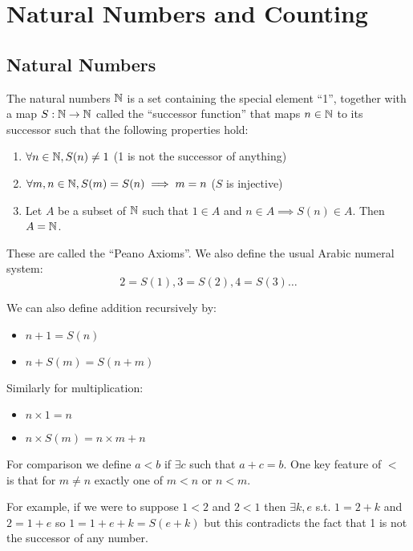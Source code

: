 \documentclass[../main.tex]{subfiles}
\begin{document}
\chapter{Natural Numbers and Counting}
\section{Natural Numbers}
\begin{definition}
  \label{naturalDef}
  The natural numbers $\mathbb{N}$ is a set containing the special element ``1'', together with a map $S: \mathbb{N} \to \mathbb{N}$ called the ``successor function'' that maps $n \in \mathbb{N}$ to its successor such that the following properties hold:
  \begin{enumerate}
    \item $\forall n \in \mathbb{N}, S(n) \neq 1$ (1 is not the successor of anything)
    \item $\forall m, n \in \mathbb{N}, S(m) = S(n) \implies m = n$ ($S$ is injective)
    \item Let $A$ be a subset of $\mathbb{N}$ such that $1 \in A$ and $n \in A \implies S(n) \in A$. Then $A = \mathbb{N}$.
  \end{enumerate}
\end{definition}
These are called the ``Peano Axioms''.
We also define the usual Arabic numeral system:
\[
  2 = S(1), 3 = S(2), 4 = S(3) \ldots
\]

We can also define addition recursively by:
\begin{itemize}
  \item $n + 1 = S(n)$
  \item $n + S(m) = S(n + m)$
\end{itemize}
Similarly for multiplication:
\begin{itemize}
  \item $n \times 1 = n$
  \item $n \times S(m) = n \times m + n$
\end{itemize}
For comparison we define $a < b$ if $\exists c$ such that $a + c = b$.
One key feature of $<$ is that for $m \neq n$ exactly one of $m < n$ or $n < m$.
\begin{example}
  For example, if we were to suppose $1 < 2$ and $2 < 1$ then  $\exists k, e$ s.t. $1 = 2 + k$ and $2 = 1 + e$ so $1 = 1 + e + k = S(e + k)$ but this contradicts the fact that 1 is not the successor of any number.
\end{example}
\end{document}

